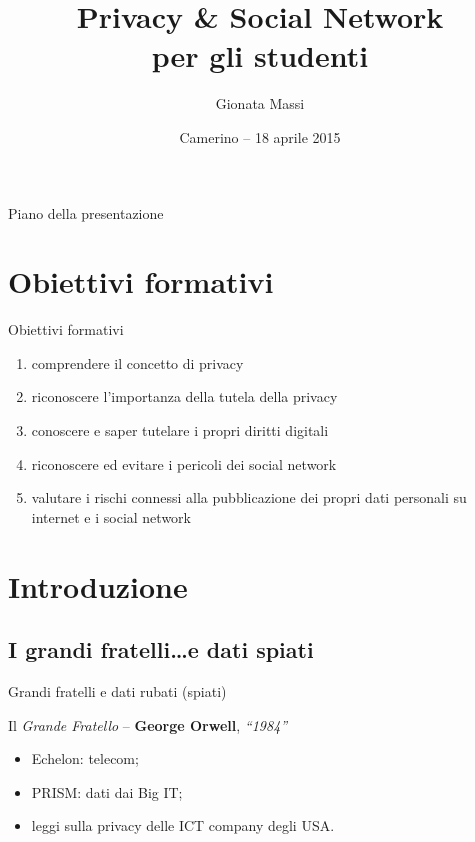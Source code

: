 \documentclass[italian]{beamer}
\title[Privacy \& Social Network]{ {\Large Privacy \& Social Network\\}{\small per gli studenti}}
\author[G. Massi]{Gionata Massi}
\institute[IIS Lamport--Knuth]{IIS Lamport Knuth}
\date[Camerino, 18 Apr. 2015]{Camerino -- 18 aprile 2015}
\begin{document}
	
\begin{frame}
	\titlepage
\end{frame}

\begin{frame}{Piano della presentazione}
	\tableofcontents
\end{frame}

\section{Obiettivi formativi}

\begin{frame}{Obiettivi formativi}
	\begin{enumerate}
		\item comprendere il concetto di privacy
		\item riconoscere l'importanza della tutela della privacy
		\item conoscere e saper tutelare i propri diritti digitali
		\item riconoscere ed evitare i pericoli dei social network
		\item valutare i rischi connessi alla pubblicazione dei propri dati personali su internet e i social network
	\end{enumerate}	
\end{frame}


\section{Introduzione}

\subsection{I grandi fratelli\ldots e dati spiati}

\begin{frame}{Grandi fratelli e dati rubati (spiati)}
	
	\begin{block}{Il \textit{Grande Fratello} -- \textbf{George Orwell}, \emph{``1984''}}
		\begin{itemize}
			\item Echelon: telecom;
			\item PRISM: dati dai Big IT;
			\item leggi sulla privacy delle ICT company degli USA.
		\end{itemize}
	\end{block}
	 
\end{frame}
\end{document}
